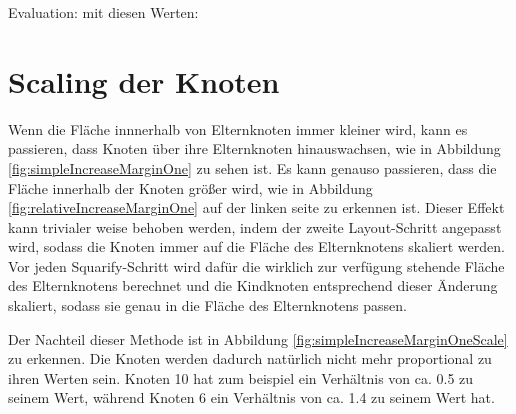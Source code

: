 Evaluation:
mit diesen Werten:



\section{Scaling der Knoten} \label{sec:ScalingKnoten}

Wenn die Fläche innnerhalb von Elternknoten immer kleiner wird, kann es passieren, dass Knoten über ihre Elternknoten hinauswachsen, wie in Abbildung \ref{fig:simpleIncreaseMarginOne} zu sehen ist. Es kann genauso passieren, dass die Fläche innerhalb der Knoten größer wird, wie in Abbildung \ref{fig:relativeIncreaseMarginOne} auf der linken seite zu erkennen ist. Dieser Effekt kann trivialer weise behoben werden, indem der zweite Layout-Schritt angepasst wird, sodass die Knoten immer auf die Fläche des Elternknotens skaliert werden. 
Vor jeden Squarify-Schritt wird dafür die wirklich zur verfügung stehende Fläche des Elternknotens berechnet und die Kindknoten entsprechend dieser Änderung skaliert, sodass sie genau in die Fläche des Elternknotens passen.

Der Nachteil dieser Methode ist in Abbildung \ref{fig:simpleIncreaseMarginOneScale} zu erkennen. Die Knoten werden dadurch natürlich nicht mehr proportional zu ihren Werten sein. Knoten 10 hat zum beispiel ein Verhältnis von ca. 0.5 zu seinem Wert, während Knoten 6 ein Verhältnis von ca. 1.4 zu seinem Wert hat.

